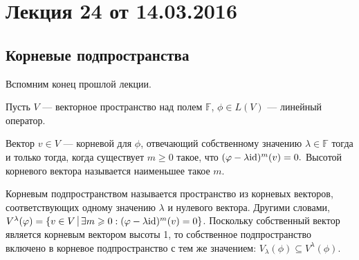 


\def\limref#1#2{{#1}\negmedspace\mid_{#2}}

\section{Лекция 24 от 14.03.2016}

\subsection*{Корневые подпространства}

Вспомним конец прошлой лекции.

Пусть $V$ --- векторное пространство над полем $\mathbb{F}$, $\phi \in L(V)$ --- линейный оператор.

Вектор $v \in V$ --- корневой для $\phi$, отвечающий собственному значению $\lambda \in \mathbb{F}$ тогда и только тогда, когда существует $m \geqslant 0 $ такое, что $(\varphi - \lambda \mathrm{id})^{m}(v) = 0.$ Высотой корневого вектора называется наименьшее такое $m$.

Корневым подпространством называется пространство из корневых векторов, соответствующих одному значению $\lambda$ и нулевого вектора. Другими словами, $V^{\lambda}(\phi) = \{v \in V \; \vline \; \exists m \geqslant 0 : (\phi - \lambda \id)^{m}(v) = 0\}$. Поскольку собственный вектор является корневым вектором высоты 1, то собственное подпространство включено в корневое подпространство с тем же значением: $V_{\lambda}(\phi) \subseteq V^{\lambda}(\phi).$

